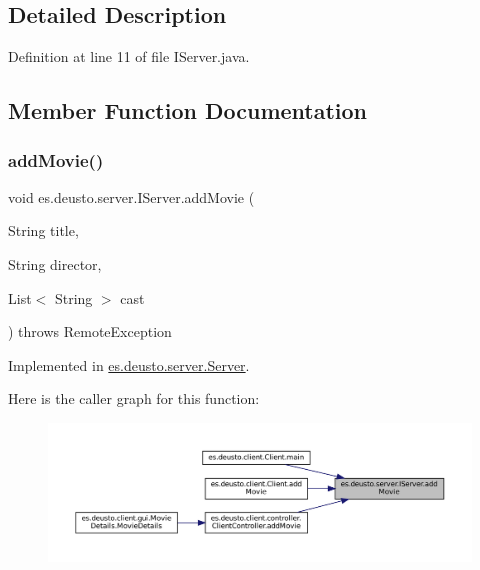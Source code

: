 \subsection{Detailed Description}


Definition at line 11 of file I\+Server.\+java.



\subsection{Member Function Documentation}
\mbox{\label{interfacees_1_1deusto_1_1server_1_1_i_server_a393d8689e14b3534dfa425e4c900532e}} 
\subsubsection{\texorpdfstring{addMovie()}{addMovie()}\hspace{0.1cm}{\footnotesize\ttfamily [1/2]}}
{\footnotesize\ttfamily void es.\+deusto.\+server.\+I\+Server.\+add\+Movie (\begin{DoxyParamCaption}\item[{String}]{title,  }\item[{String}]{director,  }\item[{List$<$ String $>$}]{cast }\end{DoxyParamCaption}) throws Remote\+Exception}



Implemented in \mbox{\hyperlink{classes_1_1deusto_1_1server_1_1_server_a150317903dc393d29f39db81e79131e0}{es.\+deusto.\+server.\+Server}}.

Here is the caller graph for this function\+:
\nopagebreak
\begin{figure}[H]
\begin{center}
\leavevmode
\includegraphics[width=350pt]{interfacees_1_1deusto_1_1server_1_1_i_server_a393d8689e14b3534dfa425e4c900532e_icgraph}
\end{center}
\end{figure}
\mbox{\label{interfacees_1_1deusto_1_1server_1_1_i_server_a9567844dce410325c606945c8d7c4dac}} 
